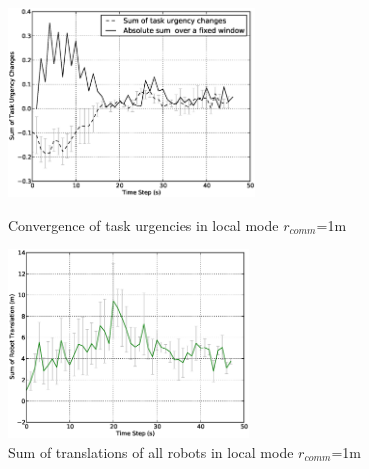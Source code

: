 \documentclass[letterpaper, 10 pt, conference]{ieeeconf}  %
\begin{document}
\begin{figure}
\begin{minipage}[t]{0.5\linewidth}
\centering
\includegraphics[height=5cm, angle=0]{images/local-1m/TaskUrgencyConvergence-1m.eps}
\caption{\small Convergence of task urgencies in local mode $r_{comm}$=1m}
\label{fig:local1m-convergence} %
\end{minipage}
\hspace{0.5cm}
\begin{minipage}[t]{0.5\linewidth}
\centering
\includegraphics[height=5cm, angle=0]{images/local-1m/DeltaTranslationStat.eps}
\caption{\small Sum of translations of all robots in local mode $r_{comm}$=1m }
\label{fig:local1m-tr} %
\end{minipage}
\end{figure}
\end{document}
